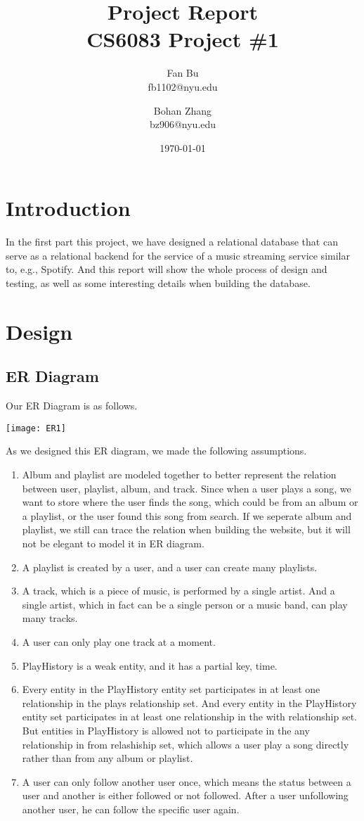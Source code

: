 \documentclass[letterpaper, 12pt]{report}
\title{
	{Project Report}\\
	{\large CS6083 Project \#1}}
\author{Fan Bu \\ fb1102@nyu.edu \and Bohan Zhang \\ bz906@nyu.edu}
\date{\today}
\begin{document}
	\maketitle
	
	\tableofcontents
	
	\chapter{Introduction}
	In the first part this project, we have designed a relational database that can serve as a relational
	backend for the service of a music streaming service similar to, e.g., Spotify. And this report will show the whole process of design and testing, as well as some interesting details when building the database.
	
	\chapter{Design}
	\section{ER Diagram}
	Our ER Diagram is as follows.
	\begin{center}
	\texttt{[image: ER1]}
	\end{center}
	As we designed this ER diagram, we made the following assumptions.
	\begin{enumerate}
		\item 
		Album and playlist are modeled together to better represent the relation between user, playlist, album, and track. Since when a user plays a song, we want to store where the user finds the song, which could be from an album or a playlist, or the user found this song from search. If we seperate album and playlist, we still can trace the relation when building the website, but it will not be elegant to model it in ER diagram.
		\item 
		A playlist is created by a user, and a user can create many playlists.
		\item 
		A track, which is a piece of music, is performed by a single artist. And a single artist, which in fact can be a single person or a music band, can play many tracks.
		\item 
		A user can only play one track at a moment.
		\item 
		PlayHistory is a weak entity, and it has a partial key, time.
		\item 
		Every entity in the PlayHistory entity set participates in at least one relationship in the plays relationship set. And every entity in the PlayHistory entity set participates in at least one relationship in the with relationship set. But entities in PlayHistory is allowed not to participate in the any relationship in from relashiship set, which allows a user play a song directly rather than from any album or playlist.
		\item 
		A user can only follow another user once, which means the status between a user and another is either followed or not followed. After a user unfollowing another user, he can follow the specific user again.
	\end{enumerate}
\end{document}
